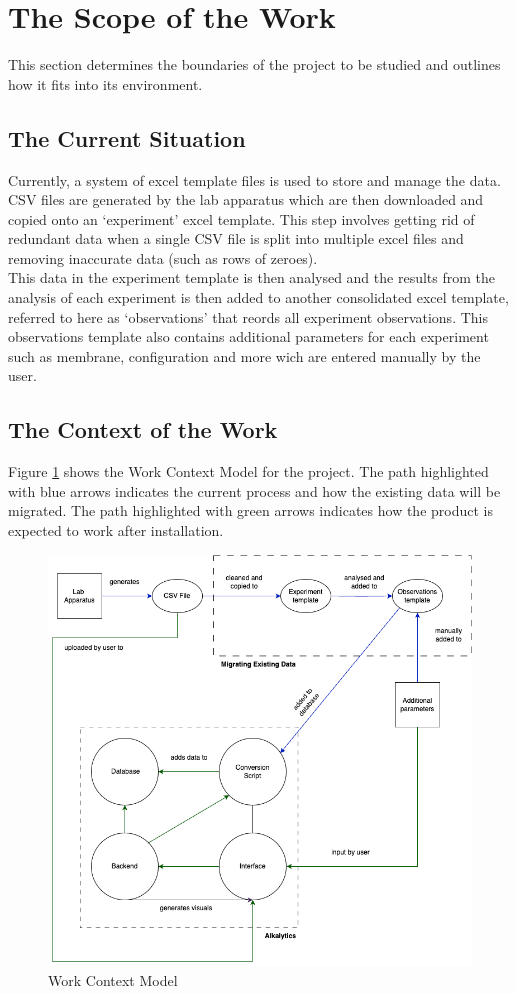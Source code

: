 \documentclass[12pt]{article}
\begin{document}
\section{The Scope of the Work}
This section determines the boundaries of the project to be studied and outlines how it fits into its environment.
\subsection{The Current Situation}
Currently, a system of excel template files is used to store and manage the data. CSV files are generated by the lab apparatus
which are then downloaded and copied onto an `experiment' excel template. This step involves getting rid of redundant data when a single CSV file is
split into multiple excel files and removing inaccurate data (such as rows of zeroes).\\
\newline
This data in the experiment template is then analysed and the results from the analysis of each experiment is then added to another consolidated excel template,
referred to here as `observations' that reords all experiment observations. This observations template also contains additional parameters for each experiment 
such as membrane, configuration and more wich are entered manually by the user.
\subsection{The Context of the Work}
Figure \ref{WorkContextModel} shows the Work Context Model for the project. The
path highlighted with blue arrows indicates the current process and how the
existing data will be migrated. The path highlighted with green arrows indicates
how the product is expected to work after installation.
\begin{figure}[H]
  \centering
  \includegraphics[scale=0.55]{Diagrams/Work Context Diagram.drawio.png}
  \caption{Work Context Model}
  \label{WorkContextModel}
\end{figure}
\end{document}
